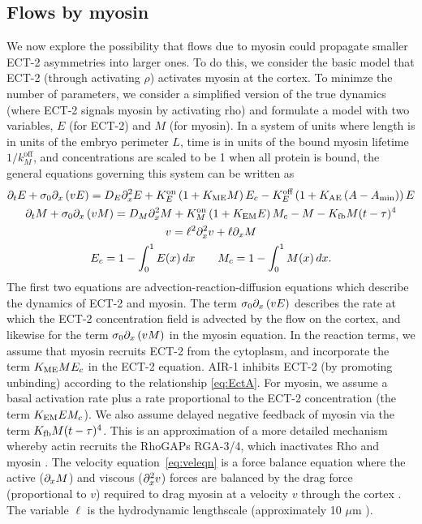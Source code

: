 \documentclass[11pt]{article}
\begin{document}
\subsection{Flows by myosin}
We now explore the possibility that flows due to myosin could propagate smaller ECT-2 asymmetries into larger ones. To do this, we consider the basic model that ECT-2 (through activating $\rho$) activates myosin at the cortex. To minimze the number of parameters, we consider a simplified version of the true dynamics (where ECT-2 signals myosin by activating rho) and formulate a model with two variables, $E$ (for ECT-2) and $M$ (for myosin). In a system of units where length is in units of the embryo perimeter $L$, time is in units of the bound myosin lifetime $1/k^\text{off}_M$, and concentrations are scaled to be 1 when all protein is bound, the general equations governing this system can be written as
\begin{subequations}
\label{eq:MySimple}
\begin{gather}
\partial_t E + \sigma_0 \partial_x \left( v E\right) = D_E \partial_x^2 E +K^\text{on}_E \left(1+K_\text{ME} M\right)E_c - K^\text{off}_E  \left(1+K_\text{AE} \left(A-A_\text{min}\right)\right)E \\
\partial_t M + \sigma_0 \partial_x \left( v M \right) = D_M \partial_x^2 M + K^\text{on}_M \left(1+K_\text{EM} E \right) M_c - M - K_\text{fb} M(t-\tau)^4 \\
\label{eq:veleqn}
v = \ell^2 \partial_x^2 v +\ell \partial_x M \\
E_c = 1-\int_0^1 E(x) \, dx \qquad M_c = 1-\int_0^1 M(x) \, dx.
\end{gather} 
\end{subequations}
The first two equations are advection-reaction-diffusion equations which describe the dynamics of ECT-2 and myosin. The term $\sigma_0 \partial_x \left(v E\right)$ describes the rate at which the ECT-2 concentration field is advected by the flow on the cortex, and likewise for the term $\sigma_0 \partial_x \left(v M\right)$ in the myosin equation. In the reaction terms, we assume that myosin recruits ECT-2 from the cytoplasm, and incorporate the term $K_\text{ME} M E_c$ in the ECT-2 equation. AIR-1 inhibits ECT-2 (by promoting unbinding) according to the relationship \eqref{eq:EctA}. For myosin, we assume a basal activation rate plus a rate proportional to the ECT-2 concentration (the term $K_\text{EM} E M_c$). We also assume delayed negative feedback of myosin via the term $K_\text{fb} M(t-\tau)^4$. This is an approximation of a more detailed mechanism whereby actin recruits the RhoGAPs RGA-3/4, which inactivates Rho and myosin \cite{michaux2018excitable, schmutz2007functions, schonegg2007rho}. The velocity equation\ \eqref{eq:veleqn} is a force balance equation where the active ($\partial_x M$) and viscous ($\partial_x^2 v$) forces are balanced by the drag force (proportional to $v$) required to drag myosin at a velocity $v$ through the cortex \cite{bois2011pattern}. The variable $\ell$ is the hydrodynamic lengthscale (approximately 10 $\mu$m \cite{mayer2010anisotropies}). 
\end{document}
